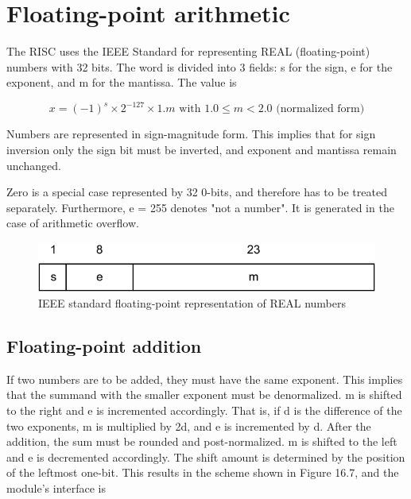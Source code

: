 \section{Floating-point arithmetic}
The RISC uses the IEEE Standard for representing REAL (floating-point) numbers with 32 bits.
The word is divided into 3 fields: s for the sign, e for the exponent, and m for the mantissa. The
value is 

\[ x = (-1)^s × 2^{-127} × 1.m\text{ with }1.0 \le m < 2.0\text{ (normalized form)} \]

Numbers are represented in sign-magnitude form. This implies that for sign inversion only the sign
bit must be inverted, and exponent and mantissa remain unchanged.

Zero is a special case represented by 32 0-bits, and therefore has to be treated separately.
Furthermore, e = 255 denotes "not a number". It is generated in the case of arithmetic overflow.

\begin{figure}[h!]
	\centering
	\includegraphics[width=.9\textwidth]{i/F/6.png}
	\caption{IEEE standard floating-point representation of REAL numbers}
	\label{fig:float-point}
\end{figure}

\subsection{Floating-point addition}
If two numbers are to be added, they must have the same exponent. This implies that the
summand with the smaller exponent must be denormalized. m is shifted to the right and e is
incremented accordingly. That is, if d is the difference of the two exponents, m is multiplied by 2d,
and e is incremented by d. After the addition, the sum must be rounded and post-normalized. m is
shifted to the left and e is decremented accordingly. The shift amount is determined by the
position of the leftmost one-bit. This results in the scheme shown in Figure 16.7, and the module's
interface is

